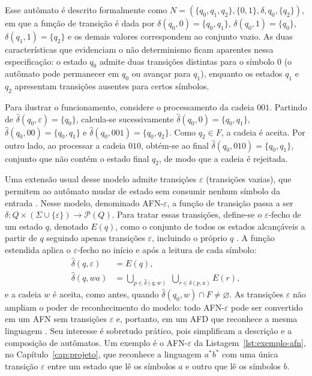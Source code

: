 \documentclass[
    12pt
    ,oneside
    ,a4paper
    ,chapter=TITLE
    ,section=TITLE
    ,sumario=abnt-6027-2012]{abntex2}
\begin{document}
Esse autômato é descrito formalmente como
$N = (\{q_0, q_1, q_2\}, \{0, 1\}, \delta, q_0, \{q_2\})$, em que a função de transição é dada
por $\delta(q_0, 0) = \{q_0, q_1\}$, $\delta(q_0, 1) = \{q_0\}$, $\delta(q_1, 1) = \{q_2\}$ e
os demais valores correspondem ao conjunto vazio. As duas características que evidenciam o
não determinismo ficam aparentes nessa especificação: o estado $q_0$ admite duas transições
distintas para o símbolo $0$ (o autômato pode permanecer em $q_0$ ou avançar para $q_1$),
enquanto os estados $q_1$ e $q_2$ apresentam transições ausentes para certos símbolos.

Para ilustrar o funcionamento, considere o processamento da cadeia $001$. Partindo de
$\hat{\delta}(q_0, \varepsilon) = \{q_0\}$, calcula-se sucessivamente
$\hat{\delta}(q_0, 0) = \{q_0, q_1\}$, $\hat{\delta}(q_0, 00) = \{q_0, q_1\}$ e
$\hat{\delta}(q_0, 001) = \{q_0, q_2\}$. Como $q_2 \in F$, a cadeia é aceita. Por outro lado, ao
processar a cadeia $010$, obtém-se ao final $\hat{\delta}(q_0, 010) = \{q_0, q_1\}$, conjunto que
não contém o estado final $q_2$, de modo que a cadeia é rejeitada.

Uma extensão usual desse modelo admite transições $\varepsilon$ (transições vazias), que
permitem ao autômato mudar de estado sem consumir nenhum símbolo da entrada
\cite{hopcroft2006,sipser2012}. Nesse modelo, denominado AFN-$\varepsilon$, a função de
transição passa a ser $\delta : Q \times (\Sigma \cup \{\varepsilon\}) \to \mathcal{P}(Q)$.
Para tratar essas transições, define-se o $\varepsilon$-fecho de um estado $q$, denotado
$E(q)$, como o conjunto de todos os estados alcançáveis a partir de $q$ seguindo apenas
transições $\varepsilon$, incluindo o próprio $q$ \cite{hopcroft2006}. A função estendida
aplica o $\varepsilon$-fecho no início e após a leitura de cada símbolo:
\begin{align*}
    \hat{\delta}(q, \varepsilon) &= E(q), \\
    \hat{\delta}(q, wa)          &= \bigcup_{p \in \hat{\delta}(q, w)} \;
                                    \bigcup_{r \in \delta(p, a)} E(r),
\end{align*}
e a cadeia $w$ é aceita, como antes, quando $\hat{\delta}(q_0, w) \cap F \neq \varnothing$.
As transições $\varepsilon$ não ampliam o poder de reconhecimento do modelo: todo
AFN-$\varepsilon$ pode ser convertido em um AFN sem transições $\varepsilon$ e, portanto, em
um AFD que reconhece a mesma linguagem \cite{hopcroft2006}. Seu interesse é sobretudo
prático, pois simplificam a descrição e a composição de autômatos. Um exemplo é o
AFN-$\varepsilon$ da Listagem~\ref{lst:exemplo-afn}, no Capítulo~\ref{cap:projeto}, que
reconhece a linguagem $a^*b^*$ com uma única transição $\varepsilon$ entre um estado que lê
os símbolos $a$ e outro que lê os símbolos $b$.
\end{document}
